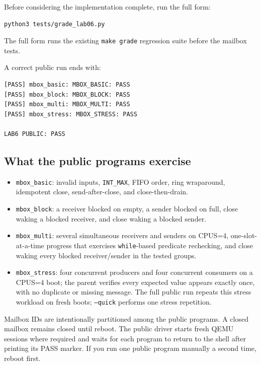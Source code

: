 \documentclass[11pt,a4paper]{article}
\newcommand{\file}[1]{\texttt{#1}}
\begin{document}
Before considering the implementation complete, run the full form:

\begin{lstlisting}[language=bash]
python3 tests/grade_lab06.py
\end{lstlisting}

The full form runs the existing \file{make grade} regression suite before the mailbox tests.

A correct public run ends with:

\begin{lstlisting}
[PASS] mbox_basic: MBOX_BASIC: PASS
[PASS] mbox_block: MBOX_BLOCK: PASS
[PASS] mbox_multi: MBOX_MULTI: PASS
[PASS] mbox_stress: MBOX_STRESS: PASS

LAB6 PUBLIC: PASS
\end{lstlisting}

\subsection*{What the public programs exercise}

\begin{itemize}[leftmargin=7mm]
\item \file{mbox\_basic}: invalid inputs, \file{INT\_MAX}, FIFO order, ring wraparound, idempotent close, send-after-close, and close-then-drain.
\item \file{mbox\_block}: a receiver blocked on empty, a sender blocked on full, close waking a blocked receiver, and close waking a blocked sender.
\item \file{mbox\_multi}: several simultaneous receivers and senders on CPUS=4, one-slot-at-a-time progress that exercises \file{while}-based predicate rechecking, and close waking every blocked receiver/sender in the tested groups.
\item \file{mbox\_stress}: four concurrent producers and four concurrent consumers on a CPUS=4 boot; the parent verifies every expected value appears exactly once, with no duplicate or missing message. The full public run repeats this stress workload on fresh boots; \file{--quick} performs one stress repetition.
\end{itemize}

Mailbox IDs are intentionally partitioned among the public programs. A closed mailbox remains closed until reboot. The public driver starts fresh QEMU sessions where required and waits for each program to return to the shell after printing its PASS marker. If you run one public program manually a second time, reboot first.
\end{document}
